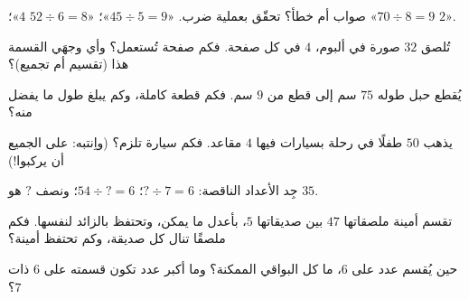 \begin{exercise}[$\star$]\label{exo:g3:division:5}
صواب أم خطأ؟ تحقّق بعملية ضرب.
«$45 \div 5 = 9$»؛ \quad «$52 \div 6 = 8$  $4$»؛
\quad «$70 \div 8 = 9$  $2$».
\end{exercise}

\begin{exercise}[$\star$]\label{exo:g3:division:6}
تُلصق $32$ صورة في ألبوم، $4$ في كل صفحة. فكم صفحة
تُستعمل؟ وأي وجهَي القسمة هذا (تقسيم أم تجميع)؟
\end{exercise}

\begin{exercise}[$\star$]\label{exo:g3:division:7}
يُقطع حبل طوله $75$ سم إلى قطع من $9$ سم. فكم قطعة كاملة،
وكم يبلغ طول ما يفضل منه؟
\end{exercise}

\begin{exercise}[$\star$]\label{exo:g3:division:8}
يذهب $50$ طفلًا في رحلة بسيارات فيها $4$ مقاعد. فكم سيارة
تلزم؟ (واِنتبه: على الجميع أن يركبوا!)
\end{exercise}

\begin{exercise}[$\star$]\label{exo:g3:division:9}
جِد الأعداد الناقصة: $? \div 7 = 6$؛ \quad
$54 \div ? = 6$؛ \quad ونصف $?$ هو $35$.
\end{exercise}

\begin{exercise}[$\star\star$]\label{exo:g3:division:10}
تقسم أمينة ملصقاتها $47$ بين صديقاتها $5$، بأعدل ما
يمكن، وتحتفظ بالزائد لنفسها. فكم ملصقًا تنال كل صديقة، وكم
تحتفظ أمينة؟
\end{exercise}

\begin{exercise}[$\star\star$]\label{exo:g3:division:11}
حين يُقسم عدد على $6$، ما كل البواقي الممكنة؟ وما أكبر عدد
تكون قسمته على $6$ ذات  $7$؟
\end{exercise}
